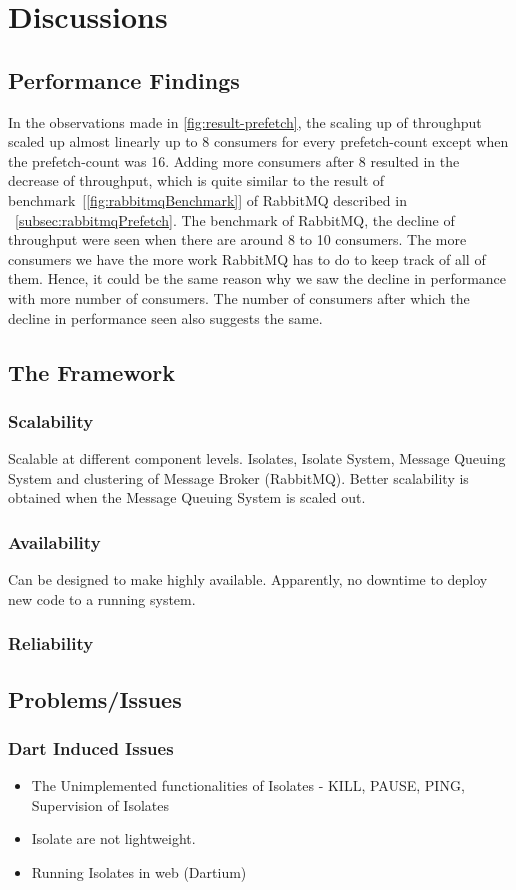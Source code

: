 \chapter{Discussions}\label{chapter:discussions}

\section{Performance Findings}
  In the observations made in \autoref{fig:result-prefetch}, the scaling up of throughput scaled up almost linearly up to 8 consumers for every prefetch-count except when the prefetch-count was 16. Adding more consumers after 8 resulted in the decrease of throughput, which is quite similar to the result of benchmark~[\autoref{fig:rabbitmqBenchmark}] of RabbitMQ described in ~\autoref{subsec:rabbitmqPrefetch}. The benchmark of RabbitMQ, the decline of throughput were seen when there are around 8 to 10 consumers.
  The more consumers we have the more work RabbitMQ has to do to keep track of all of them. Hence, it could be the same reason why we saw the decline in performance with more number of consumers. The number of consumers after which the decline in performance seen also suggests the same.




\section{The Framework}

\subsection{Scalability}
    Scalable at different component levels. Isolates, Isolate System, Message Queuing System and clustering of Message Broker (RabbitMQ). Better scalability is obtained when the Message Queuing System is scaled out.

\subsection{Availability}
    Can be designed to make highly available. Apparently, no downtime to deploy new code to a running system.

  \subsection{Reliability}


\section{Problems/Issues}
\subsection{Dart Induced Issues}
  \begin{itemize}
  \item The Unimplemented functionalities of Isolates
    - KILL, PAUSE, PING, Supervision of Isolates
  \item Isolate are not lightweight.
  \item Running Isolates in web (Dartium)
\end{itemize}
